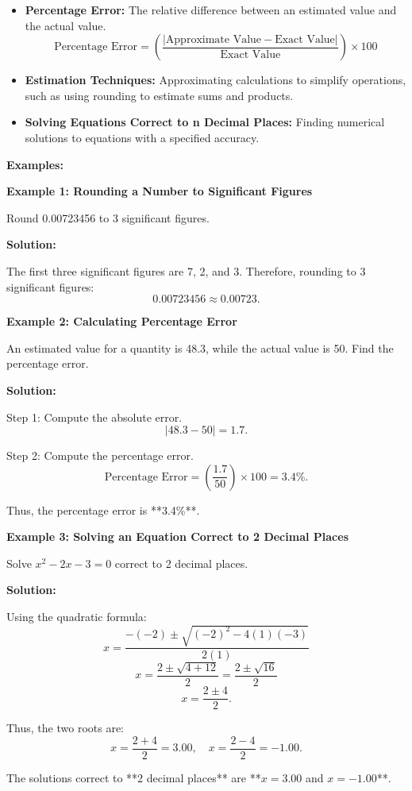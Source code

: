 \begin{itemize}
	\item \textbf{Percentage Error:} The relative difference between an estimated value and the actual value.
	\[
	\text{Percentage Error} = \left( \frac{| \text{Approximate Value} - \text{Exact Value} |}{\text{Exact Value}} \right) \times 100
	\]
	
	\item \textbf{Estimation Techniques:} Approximating calculations to simplify operations, such as using rounding to estimate sums and products.
	
	\item \textbf{Solving Equations Correct to n Decimal Places:} Finding numerical solutions to equations with a specified accuracy.
\end{itemize}

\textbf{Examples:}

\begin{flushleft}
	\textbf{Example 1: Rounding a Number to Significant Figures}
	
	Round 0.00723456 to 3 significant figures.
	
	\textbf{Solution:}
	
	The first three significant figures are 7, 2, and 3. Therefore, rounding to 3 significant figures:
	\[
	0.00723456 \approx 0.00723.
	\]
\end{flushleft}

\begin{flushleft}
	\textbf{Example 2: Calculating Percentage Error}
	
	An estimated value for a quantity is 48.3, while the actual value is 50. Find the percentage error.
	
	\textbf{Solution:}
	
	Step 1: Compute the absolute error.
	\[
	| 48.3 - 50 | = 1.7.
	\]
	
	Step 2: Compute the percentage error.
	\[
	\text{Percentage Error} = \left( \frac{1.7}{50} \right) \times 100 = 3.4\%.
	\]
	
	Thus, the percentage error is **3.4\%**.
\end{flushleft}

\begin{flushleft}
	\textbf{Example 3: Solving an Equation Correct to 2 Decimal Places}
	
	Solve $x^2 - 2x - 3 = 0$ correct to 2 decimal places.
	
	\textbf{Solution:}
	
	Using the quadratic formula:
	\[
	x = \frac{-(-2) \pm \sqrt{(-2)^2 - 4(1)(-3)}}{2(1)}
	\]
	\[
	x = \frac{2 \pm \sqrt{4 + 12}}{2} = \frac{2 \pm \sqrt{16}}{2}
	\]
	\[
	x = \frac{2 \pm 4}{2}.
	\]
	
	Thus, the two roots are:
	\[
	x = \frac{2 + 4}{2} = 3.00, \quad x = \frac{2 - 4}{2} = -1.00.
	\]
	
	The solutions correct to **2 decimal places** are **$x = 3.00$ and $x = -1.00$**.
\end{flushleft}

